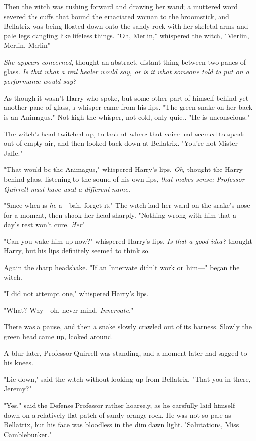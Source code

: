 Then the witch was rushing forward and drawing her wand; a muttered word
severed the cuffs that bound the emaciated woman to the broomstick, and
Bellatrix was being floated down onto the sandy rock with her skeletal arms and
pale legs dangling like lifeless things. "Oh, Merlin," whispered the witch,
"Merlin, Merlin, Merlin{\el}"

\emph{She appears concerned,} thought an abstract, distant thing between two
panes of glass. \emph{Is that what a real healer would say, or is it what
someone told to put on a performance would say?}

As though it wasn't Harry who spoke, but some other part of himself behind yet
another pane of glass, a whisper came from his lips. "The green snake on her
back is an Animagus." Not high the whisper, not cold, only quiet. "He is
unconscious."

The witch's head twitched up, to look at where that voice had seemed to speak
out of empty air, and then looked back down at Bellatrix. "You're not Mister
Jaffe."

"That would be the Animagus," whispered Harry's lips. \emph{Oh,} thought the
Harry behind glass, listening to the sound of his own lips, \emph{that makes
sense; Professor Quirrell must have used a different name.}

"Since when is \emph{he} a---bah, forget it." The witch laid her wand on the
snake's nose for a moment, then shook her head sharply. "Nothing wrong with him
that a day's rest won't cure. \emph{Her{\el}}"

"Can you wake him up now?" whispered Harry's lips. \emph{Is that a good idea?}
thought Harry, but his lips definitely seemed to think so.

Again the sharp headshake. "If an Innervate didn't work on him---" began the
witch.

"I did not attempt one," whispered Harry's lips.

"What? Why---oh, never mind. \emph{Innervate.}"

There was a pause, and then a snake slowly crawled out of its harness. Slowly
the green head came up, looked around.

A blur later, Professor Quirrell was standing, and a moment later had sagged to
his knees.

"Lie down," said the witch without looking up from Bellatrix. "That you in
there, Jeremy?"

"Yes," said the Defense Professor rather hoarsely, as he carefully laid himself
down on a relatively flat patch of sandy orange rock. He was not so pale as
Bellatrix, but his face was bloodless in the dim dawn light. "Salutations, Miss
Camblebunker."

